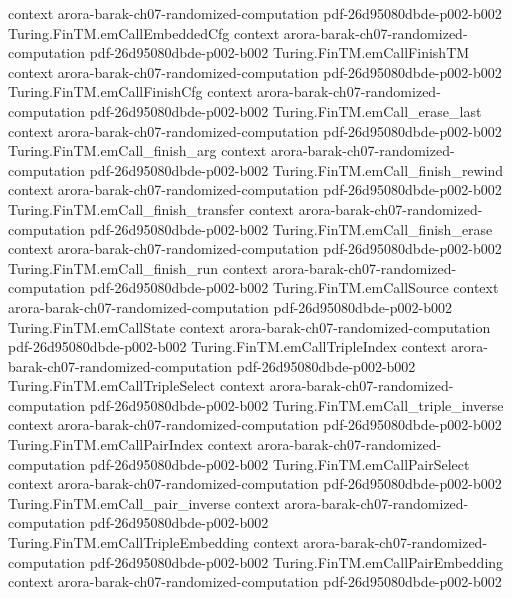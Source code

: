\begin{theorem}
  {context}
  {arora-barak-ch07-randomized-computation}
  {pdf-26d95080dbde-p002-b002}
\proofstep
  {Turing.FinTM.emCallEmbeddedCfg}
  {context}
  {arora-barak-ch07-randomized-computation}
  {pdf-26d95080dbde-p002-b002}
\proofstep
  {Turing.FinTM.emCallFinishTM}
  {context}
  {arora-barak-ch07-randomized-computation}
  {pdf-26d95080dbde-p002-b002}
\proofstep
  {Turing.FinTM.emCallFinishCfg}
  {context}
  {arora-barak-ch07-randomized-computation}
  {pdf-26d95080dbde-p002-b002}
\proofstep
  {Turing.FinTM.emCall_erase_last}
  {context}
  {arora-barak-ch07-randomized-computation}
  {pdf-26d95080dbde-p002-b002}
\proofstep
  {Turing.FinTM.emCall_finish_arg}
  {context}
  {arora-barak-ch07-randomized-computation}
  {pdf-26d95080dbde-p002-b002}
\proofstep
  {Turing.FinTM.emCall_finish_rewind}
  {context}
  {arora-barak-ch07-randomized-computation}
  {pdf-26d95080dbde-p002-b002}
\proofstep
  {Turing.FinTM.emCall_finish_transfer}
  {context}
  {arora-barak-ch07-randomized-computation}
  {pdf-26d95080dbde-p002-b002}
\proofstep
  {Turing.FinTM.emCall_finish_erase}
  {context}
  {arora-barak-ch07-randomized-computation}
  {pdf-26d95080dbde-p002-b002}
\proofstep
  {Turing.FinTM.emCall_finish_run}
  {context}
  {arora-barak-ch07-randomized-computation}
  {pdf-26d95080dbde-p002-b002}
\proofstep
  {Turing.FinTM.emCallSource}
  {context}
  {arora-barak-ch07-randomized-computation}
  {pdf-26d95080dbde-p002-b002}
\proofstep
  {Turing.FinTM.emCallState}
  {context}
  {arora-barak-ch07-randomized-computation}
  {pdf-26d95080dbde-p002-b002}
\proofstep
  {Turing.FinTM.emCallTripleIndex}
  {context}
  {arora-barak-ch07-randomized-computation}
  {pdf-26d95080dbde-p002-b002}
\proofstep
  {Turing.FinTM.emCallTripleSelect}
  {context}
  {arora-barak-ch07-randomized-computation}
  {pdf-26d95080dbde-p002-b002}
\proofstep
  {Turing.FinTM.emCall_triple_inverse}
  {context}
  {arora-barak-ch07-randomized-computation}
  {pdf-26d95080dbde-p002-b002}
\proofstep
  {Turing.FinTM.emCallPairIndex}
  {context}
  {arora-barak-ch07-randomized-computation}
  {pdf-26d95080dbde-p002-b002}
\proofstep
  {Turing.FinTM.emCallPairSelect}
  {context}
  {arora-barak-ch07-randomized-computation}
  {pdf-26d95080dbde-p002-b002}
\proofstep
  {Turing.FinTM.emCall_pair_inverse}
  {context}
  {arora-barak-ch07-randomized-computation}
  {pdf-26d95080dbde-p002-b002}
\proofstep
  {Turing.FinTM.emCallTripleEmbedding}
  {context}
  {arora-barak-ch07-randomized-computation}
  {pdf-26d95080dbde-p002-b002}
\proofstep
  {Turing.FinTM.emCallPairEmbedding}
  {context}
  {arora-barak-ch07-randomized-computation}
  {pdf-26d95080dbde-p002-b002}

\end{theorem}
